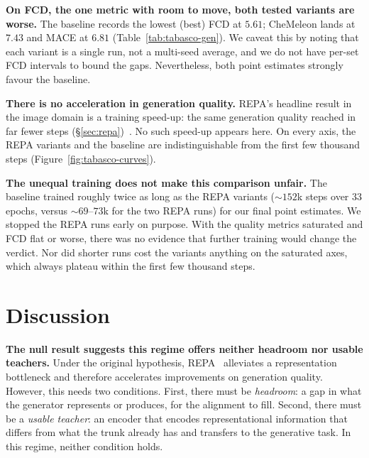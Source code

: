 \documentclass[12pt,a4paper,twoside]{report}
\begin{document}


\textbf{On FCD, the one metric with room to move, both tested variants are worse.} The baseline records the lowest (best) FCD at $5.61$; CheMeleon lands at $7.43$ and MACE at $6.81$ (Table~\ref{tab:tabasco-gen}). We caveat this by noting that each variant is a single run, not a multi-seed average, and we do not have per-set FCD intervals to bound the gaps. Nevertheless, both point estimates strongly favour the baseline.

\textbf{There is no acceleration in generation quality.} REPA's headline result in the image domain is a training speed-up: the same generation quality reached in far fewer steps (\S\ref{sec:repa})~\cite{REPA}. No such speed-up appears here. On every axis, the REPA variants and the baseline are indistinguishable from the first few thousand steps (Figure~\ref{fig:tabasco-curves}).

\textbf{The unequal training does not make this comparison unfair.} The baseline trained roughly twice as long as the REPA variants (${\sim}152$k steps over 33 epochs, versus ${\sim}69$--$73$k for the two REPA runs) for our final point estimates. We stopped the REPA runs early on purpose. With the quality metrics saturated and FCD flat or worse, there was no evidence that further training would change the verdict. Nor did shorter runs cost the variants anything on the saturated axes, which always plateau within the first few thousand steps.





\section{Discussion}
\label{sec:tabasco-diagnosis}

\textbf{The null result suggests this regime offers neither headroom nor usable teachers.} Under the original hypothesis, REPA~\cite{REPA} alleviates a representation bottleneck and therefore accelerates improvements on generation quality. However, this needs two conditions. First, there must be \emph{headroom}: a gap in what the generator represents or produces, for the alignment to fill. Second, there must be a \emph{usable teacher}: an encoder that encodes representational information that differs from what the trunk already has and transfers to the generative task. In this regime, neither condition holds.
\end{document}
